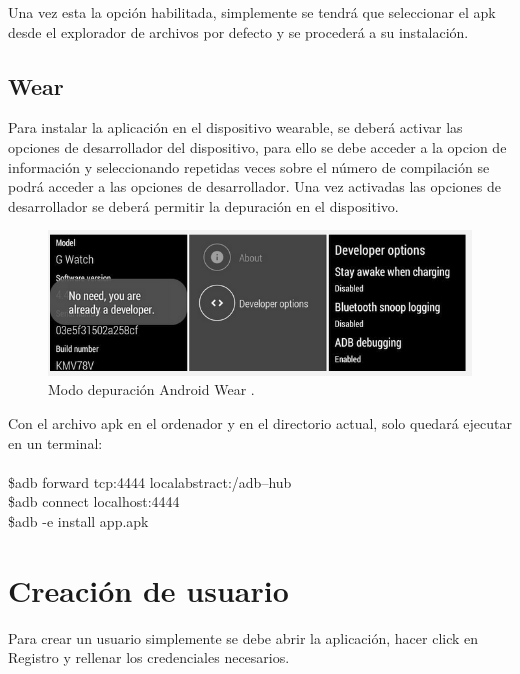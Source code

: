 Una vez esta la opción habilitada, simplemente se tendrá que seleccionar el apk desde el explorador de archivos por defecto y se procederá a su instalación.

\subsection*{Wear}

Para instalar la aplicación en el dispositivo wearable, se deberá activar las opciones de desarrollador del dispositivo, para ello se debe acceder a la opcion de información y seleccionando repetidas veces sobre el número de compilación se podrá acceder a las opciones de desarrollador. Una vez activadas las opciones de desarrollador se deberá permitir la depuración en el dispositivo.


\begin{figure}[H]
	\centering
	\includegraphics[scale=0.5]{imagenes/dev.png}
	\caption{Modo depuración Android Wear \cite{depur}.}
	\label{Modo depuración Android Wear}
\end{figure}

Con el archivo apk en el ordenador y en el directorio actual, solo quedará ejecutar en un terminal:
\\
\\
\$adb forward tcp:4444 localabstract:/adb–hub \\
\$adb connect localhost:4444 \\
\$adb -e install app.apk \\

\section{Creación de usuario}

Para crear un usuario simplemente se debe abrir la aplicación, hacer click en Registro y rellenar los credenciales necesarios.



